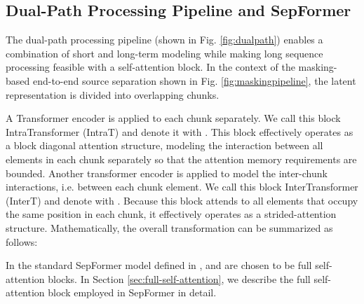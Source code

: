 \documentclass[lettersize,journal]{IEEEtran}
\begin{document}
\subsection{Dual-Path Processing Pipeline and SepFormer}
\label{sec:dppipeline-sepformer}
The dual-path processing pipeline \cite{luo2020dualpath} (shown in Fig. \ref{fig:dualpath}) enables a combination of short and long-term modeling while making long sequence processing feasible with a self-attention block. In the context of the masking-based end-to-end source separation shown in Fig. \ref{fig:maskingpipeline}, the latent representation  is divided into overlapping chunks. 


A Transformer encoder is applied to each chunk separately. We call this block IntraTransformer (IntraT) and denote it with . This block effectively operates as a block diagonal attention structure, modeling the interaction between all elements in each chunk separately so that the attention memory requirements are bounded. 
Another transformer encoder is applied to model the inter-chunk interactions, i.e. between each chunk element. We call this block InterTransformer (InterT) and denote with . 
Because this block attends to all elements that occupy the same position in each chunk, it effectively operates as a strided-attention structure. Mathematically, the overall transformation can be summarized as follows: 

In the standard SepFormer model defined in \cite{subakan2020attention},  and  are chosen to be full self-attention blocks. In Section \ref{sec:full-self-attention}, we describe the full self-attention block employed in SepFormer in detail. 
\end{document}
